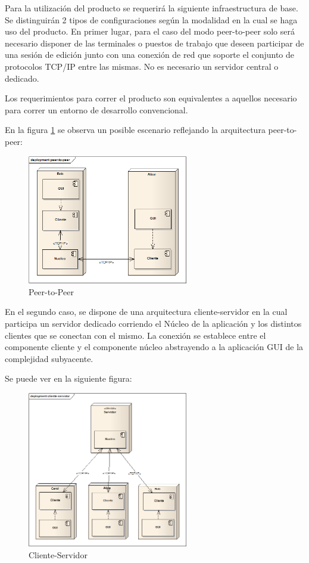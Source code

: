 \documentclass[12pt,a4paper]{article}
\begin{document}
Para la utilización del producto se requerirá la siguiente infraestructura de base.
Se distinguirán 2 tipos de configuraciones según la modalidad en la cual se haga uso del producto.
En primer lugar, para el caso del modo peer-to-peer solo será necesario disponer de las terminales o puestos de trabajo que deseen participar de una sesión de edición junto con una conexión de red que soporte el conjunto de protocolos TCP/IP entre las mismas. No es necesario un servidor central o dedicado.

Los requerimientos para correr el producto son equivalentes a aquellos necesario para correr un entorno de desarrollo convencional.

En la figura \ref{peer} se observa un posible escenario reflejando la arquitectura peer-to-peer:


	\begin{figure}[!ht]
		\begin{center}
			\includegraphics[width=7cm]{peer-to-peer.png}
			\caption{\label{peer} Peer-to-Peer }
		\end{center}
	\end{figure}



En el segundo caso, se dispone de una arquitectura cliente-servidor en la cual participa un servidor dedicado corriendo el Núcleo de la aplicación y los distintos clientes que se conectan con el mismo. La conexión se establece entre el componente cliente y el componente núcleo abstrayendo a la aplicación GUI de la complejidad subyacente.

Se puede ver en la siguiente figura:

	\begin{figure}[!ht]
		\begin{center}
			\includegraphics[width=7cm]{cliente-servidor.png}
			\caption{\label{server-client} Cliente-Servidor }
		\end{center}
	\end{figure}
\end{document}
